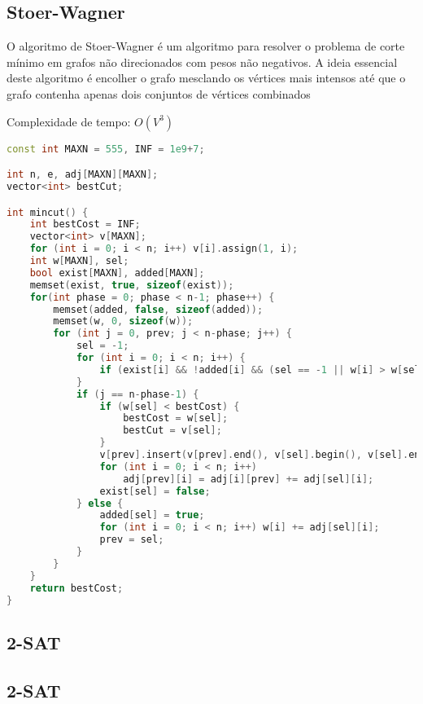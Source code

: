 \documentclass[11pt, a4paper, twoside]{article}
\begin{document}
\subsection{Stoer-Wagner}


O algoritmo de Stoer-Wagner é um algoritmo para resolver o problema de corte mínimo em grafos não direcionados com pesos não negativos. A ideia essencial deste algoritmo é encolher o grafo mesclando os vértices mais intensos até que o grafo contenha apenas dois conjuntos de vértices combinados

Complexidade de tempo: $O(V^3)$

\begin{lstlisting}[language=C++]
const int MAXN = 555, INF = 1e9+7;

int n, e, adj[MAXN][MAXN];
vector<int> bestCut;

int mincut() {
    int bestCost = INF;
    vector<int> v[MAXN];
    for (int i = 0; i < n; i++) v[i].assign(1, i);
    int w[MAXN], sel;
    bool exist[MAXN], added[MAXN];
    memset(exist, true, sizeof(exist));
    for(int phase = 0; phase < n-1; phase++) {
        memset(added, false, sizeof(added));
        memset(w, 0, sizeof(w));
        for (int j = 0, prev; j < n-phase; j++) {
            sel = -1;
            for (int i = 0; i < n; i++) {
                if (exist[i] && !added[i] && (sel == -1 || w[i] > w[sel])) sel = i;
            }
            if (j == n-phase-1) {
                if (w[sel] < bestCost) {
                    bestCost = w[sel];
                    bestCut = v[sel];
                }
                v[prev].insert(v[prev].end(), v[sel].begin(), v[sel].end());
                for (int i = 0; i < n; i++) 
                    adj[prev][i] = adj[i][prev] += adj[sel][i];
                exist[sel] = false;
            } else {
                added[sel] = true;
                for (int i = 0; i < n; i++) w[i] += adj[sel][i];
                prev = sel;
            }
        }
    }
    return bestCost;
}
\end{lstlisting}

\subsection{2-SAT}

\subsection{2-SAT  }
\end{document}
